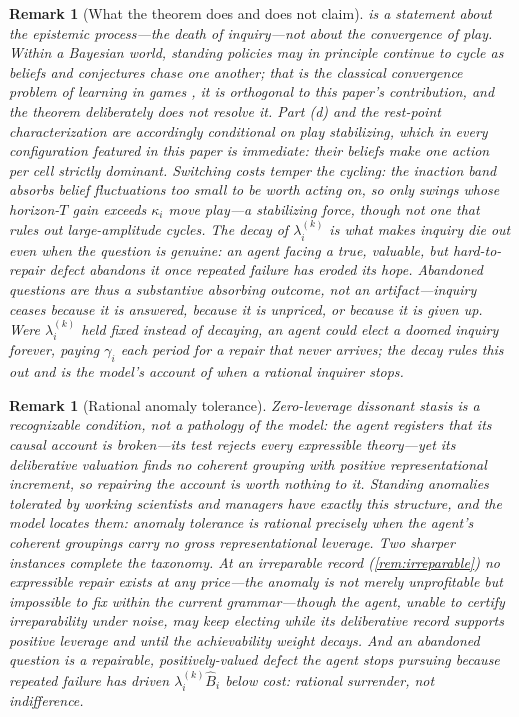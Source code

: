 \documentclass[11pt]{article}
\newtheorem{remark}[assumption]{Remark}
\theoremstyle{definition}
\begin{document}
\begin{remark}[What the theorem does and does not claim]
\label{rem:scope}
 is a statement about the epistemic process---the death of inquiry---not about the convergence of play.
Within a Bayesian world, standing policies may in principle continue to cycle as beliefs and conjectures chase one another; that is the classical convergence problem of learning in games \citep{FudenbergLevine1993,KalaiLehrer1993a}, it is orthogonal to this paper's contribution, and the theorem deliberately does not resolve it.
Part (d) and the rest-point characterization are accordingly conditional on play stabilizing, which in every configuration featured in this paper is immediate: their beliefs make one action per cell strictly dominant.
Switching costs temper the cycling: the inaction band absorbs belief fluctuations too small to be worth acting on, so only swings whose horizon-$T$ gain exceeds $\kappa_i$ move play---a stabilizing force, though not one that rules out large-amplitude cycles.
The decay of $\lambda_i^{(k)}$ is what makes inquiry die out even when the question is genuine: an agent facing a true, valuable, but hard-to-repair defect abandons it once repeated failure has eroded its hope.
Abandoned questions are thus a substantive absorbing outcome, not an artifact---inquiry ceases because it is answered, because it is unpriced, or because it is given up.
Were $\lambda_i^{(k)}$ held fixed instead of decaying, an agent could elect a doomed inquiry forever, paying $\gamma_i$ each period for a repair that never arrives; the decay rules this out and is the model's account of when a rational inquirer stops.
\end{remark}

\begin{remark}[Rational anomaly tolerance]
\label{rem:anomaly}
Zero-leverage dissonant stasis is a recognizable condition, not a pathology of the model: the agent registers that its causal account is broken---its test rejects every expressible theory---yet its deliberative valuation finds no coherent grouping with positive representational increment, so repairing the account is worth nothing to it.
Standing anomalies tolerated by working scientists and managers have exactly this structure, and the model locates them: anomaly tolerance is rational precisely when the agent's coherent groupings carry no gross representational leverage.
Two sharper instances complete the taxonomy.
At an irreparable record (\cref{rem:irreparable}) no expressible repair exists at any price---the anomaly is not merely unprofitable but impossible to fix within the current grammar---though the agent, unable to certify irreparability under noise, may keep electing while its deliberative record supports positive leverage and until the achievability weight decays.
And an \emph{abandoned question} is a repairable, positively-valued defect the agent stops pursuing because repeated failure has driven $\lambda_i^{(k)}\widehat B_i$ below cost: rational surrender, not indifference.
\end{remark}
\end{document}
